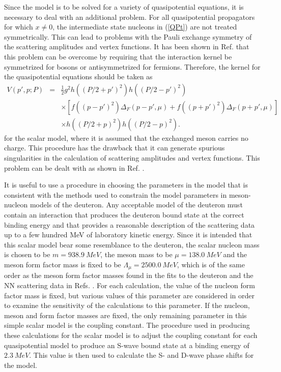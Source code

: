 \documentclass[mythesis.tex]{subfiles}
\begin{document}
Since the model is to be solved for a variety of quasipotential equations,
it is necessary to deal with an additional problem. For all quasipotential
propagators for which $x\neq 0$, the intermediate state nucleons in
(\ref{QPt}) are not treated symmetrically. This can lead to problems with
the Pauli exchange symmetry of the scattering amplitudes and vertex
functions. It has been shown in Ref. \cite{FVOHB} that this problem can be
overcome
by requiring that the interaction kernel be symmetrized for bosons or
antisymmetrized for fermions. Therefore, the kernel for the quasipotential
equations should be taken as
%
\begin{eqnarray}
V(p',p;P)&=& \frac{1}{2}g^2 h((P/2+p')^2)h((P/2-p')^2)\nonumber \\
& &\times\left[f((p-p')^2) \Delta_F(p-p',\mu)+f((p+p')^2)
\Delta_F(p+p',\mu)\right]\nonumber \\
& &\times h((P/2+p)^2)h((P/2-p)^2).
\end{eqnarray}
%
for the scalar model, where it is assumed that the exchanged meson carries
no charge.
This procedure has the drawback that it can generate spurious singularities
in the calculation of scattering amplitudes and vertex functions. This
problem can be dealt with as shown in Ref. \cite{FVOHB}.

It is useful to use a procedure in choosing the parameters in the model that
is consistent with the methods used to constrain the model parameters in
meson-nucleon models of the deuteron. Any acceptable model of the deuteron
must contain an interaction that produces the deuteron bound state
at the correct binding energy and that provides a reasonable description
of the scattering data up to a few hundred MeV of laboratory kinetic
energy. Since it is intended that this scalar model  bear some
resemblance to the
deuteron, the scalar nucleon mass is chosen to be $m=938.9~MeV$, the
meson mass to be $\mu=138.0~MeV$ and the meson form factor mass is fixed to
be $\Lambda_\mu=2500.0~MeV$, which is of the same order as the meson
form factor masses found in the fits to the deuteron and the NN scattering
data in Refs. \cite{FVOHA,FVOHB}. For each calculation, the value of
the nucleon form factor
mass is fixed, but  various values of this parameter are considered in
order to examine
the sensitivity of the calculations to this parameter.
If  the nucleon, meson and form factor masses are fixed,
the only remaining parameter in this simple scalar model is the coupling
constant. The procedure used in producing these calculations for the scalar
model is to adjust the coupling constant for each quasipotential model to
produce an S-wave bound state at a binding energy of $2.3~MeV$. This value
is then
used to calculate the S- and D-wave phase shifts for the model.
\end{document}
